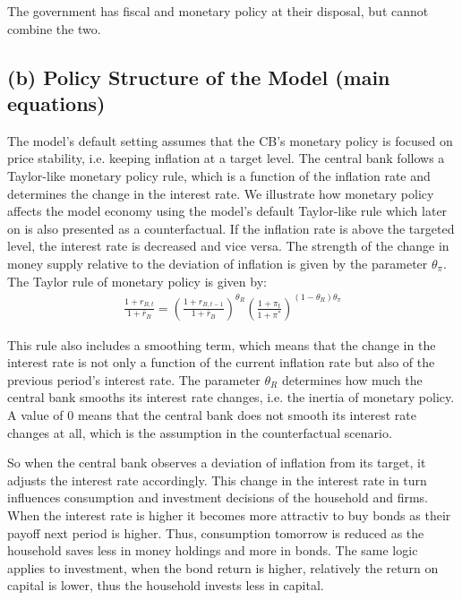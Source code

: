 \documentclass[12pt]{article}
\begin{document}
The government has fiscal and monetary policy at their disposal, but cannot combine the two. 



\subsection*{(b) Policy Structure of the Model (main equations)}
The model's default setting assumes that the CB's monetary policy is focused on price stability, i.e. keeping inflation at a target level. The central bank
follows a Taylor-like monetary policy rule, which is a function of the inflation rate and determines the change in the interest rate. We illustrate how monetary policy affects the model economy using the model's default Taylor-like rule which later on is also presented as a counterfactual. If the inflation rate is above the targeted level, the interest rate is decreased and vice versa. The strength of the change in money supply relative to the deviation of inflation is given by the parameter $\theta_{\pi}$. 
The Taylor rule of monetary policy is given by:
\begin{align}
    \frac{1 + r_{B,t}}{1 + \bar{r}_B} = \left( \frac{1 + r_{B,t-1}}{1 + \bar{r}_B} \right)^{\theta_R} \left( \frac{1 + \pi_t}{1 + \pi^*} \right)^{(1 - \theta_R)\theta_{\pi}}
\end{align}

This rule also includes a smoothing term, which means that the change in the interest rate is not only a function of the current inflation rate but also of the previous period's interest rate. The parameter $\theta_R$ determines how much the central bank smooths its interest rate changes, i.e. the inertia of monetary policy. A value of 0 means that the central bank does not smooth its interest rate changes at all, which is the assumption in the counterfactual scenario. 

So when the central bank observes a deviation of inflation from its target, it adjusts the interest rate accordingly. This change in the interest rate in turn influences consumption and investment decisions of the household and firms. When the interest rate is higher it becomes more attractiv to buy bonds as their payoff next period is higher. Thus, consumption tomorrow is reduced as the household saves less in money holdings and more in bonds. The same logic applies to investment, when the bond return is higher, relatively the return on capital is lower, thus the household invests less in capital.
\end{document}
